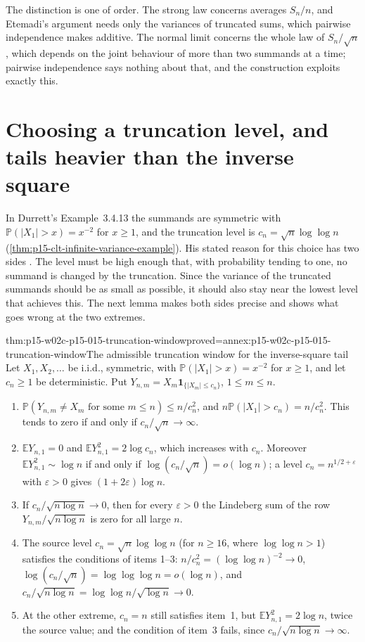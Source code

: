 The distinction is one of order. The strong law concerns averages
\(S_n/n\), and Etemadi's argument needs only the variances of truncated
sums, which pairwise independence makes additive. The normal limit
concerns the whole law of \(S_n/\sqrt n\), which depends on the joint
behaviour of more than two summands at a time; pairwise independence
says nothing about that, and the construction exploits exactly this.

\section{Choosing a truncation level, and tails heavier than the inverse square}
\label{sec:p15-w02c-p15-015-truncation}

In Durrett's Example~3.4.13 the summands are symmetric with
\(\mathbb P(|X_1|>x)=x^{-2}\) for \(x\geq1\), and the truncation level is
\(c_n=\sqrt n\log\log n\) (\cref{thm:p15-clt-infinite-variance-example}).
His stated reason for this choice has two sides
\cite[p.~151]{DurrettPTEAuthor2019}. The level must be high enough that,
with probability tending to one, no summand is changed by the truncation.
Since the variance of the truncated summands should be as small as
possible, it should also stay near the lowest level that achieves this.
The next lemma makes both sides precise and shows what goes wrong at the
two extremes.

\begin{hblemma}{thm:p15-w02c-p15-015-truncation-window}{proved=annex:p15-w02c-p15-015-truncation-window}{The admissible truncation window for the inverse-square tail}
Let \(X_1,X_2,\ldots\) be i.i.d., symmetric, with
\(\mathbb P(|X_1|>x)=x^{-2}\) for \(x\geq1\), and let \(c_n\geq1\) be
deterministic. Put \(Y_{n,m}=X_m\mathbf1_{\{|X_m|\leq c_n\}}\),
\(1\leq m\leq n\).
\begin{enumerate}
\item \(\mathbb P(Y_{n,m}\ne X_m\text{ for some }m\leq n)\leq n/c_n^2\),
 and \(n\mathbb P(|X_1|>c_n)=n/c_n^2\). This tends to zero if and only
 if \(c_n/\sqrt n\to\infty\).
\item \(\mathbb EY_{n,1}=0\) and \(\mathbb EY_{n,1}^2=2\log c_n\),
 which increases with \(c_n\). Moreover
 \(\mathbb EY_{n,1}^2\sim\log n\) if and only if
 \(\log(c_n/\sqrt n)=o(\log n)\); a level \(c_n=n^{1/2+\varepsilon}\)
 with \(\varepsilon>0\) gives \((1+2\varepsilon)\log n\).
\item If \(c_n/\sqrt{n\log n}\to0\), then for every \(\varepsilon>0\)
 the Lindeberg sum of the row \(Y_{n,m}/\sqrt{n\log n}\) is zero for all
 large \(n\).
\item The source level \(c_n=\sqrt n\log\log n\) (for \(n\geq16\), where
 \(\log\log n>1\)) satisfies the conditions of items 1--3:
 \(n/c_n^2=(\log\log n)^{-2}\to0\),
 \(\log(c_n/\sqrt n)=\log\log\log n=o(\log n)\), and
 \(c_n/\sqrt{n\log n}=\log\log n/\sqrt{\log n}\to0\).
\item At the other extreme, \(c_n=n\) still satisfies item~1, but
 \(\mathbb EY_{n,1}^2=2\log n\), twice the source value; and the
 condition of item~3 fails, since \(c_n/\sqrt{n\log n}\to\infty\).
\end{enumerate}
\end{hblemma}

